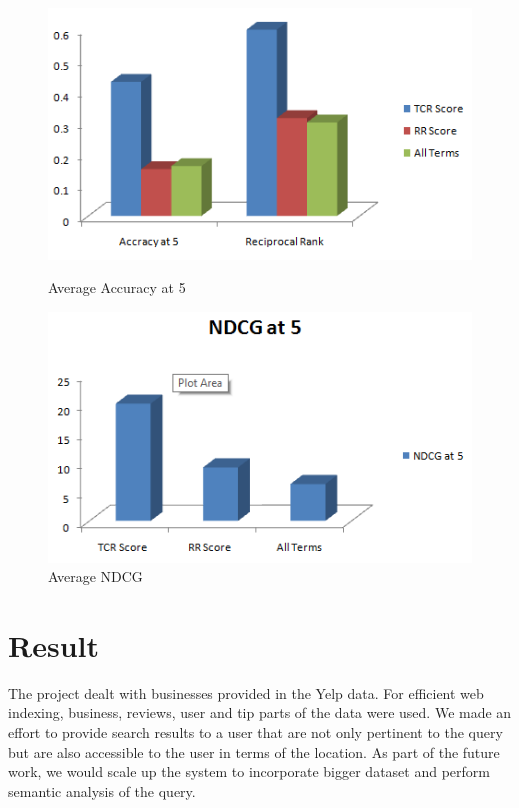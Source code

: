 \documentclass[paper=letter, fontsize=15pt]{article} %
\begin{document}
\begin{figure}[h!]
\begin{minipage}{.5\linewidth}
\centering
\includegraphics[scale=0.6]{Avg.png}
\caption{Average Accuracy at 5}
\end{minipage}
\begin{minipage}{.5\linewidth}
\centering
\includegraphics[scale=0.6]{AvgNDCG.png}
\caption{Average NDCG}
\end{minipage}
\end{figure} 

\section{Result}
The project dealt with businesses provided in the Yelp data. For efficient web indexing, business, reviews, user and tip parts of the data were used. We made an effort to provide search results to a user that are not only pertinent to the query but are also accessible to the user in terms of the location.
As part of the future work, we would scale up the system to incorporate bigger dataset and perform semantic analysis of the query.

      

\end{document}
